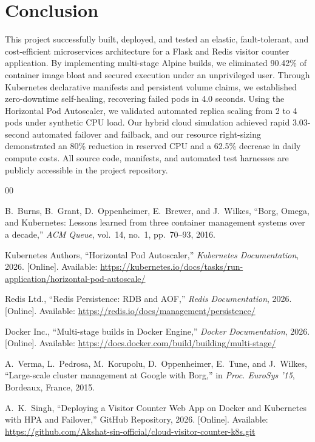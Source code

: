 \documentclass[conference]{IEEEtran}
\begin{document}
\section{Conclusion}

This project successfully built, deployed, and tested an elastic, fault-tolerant, and cost-efficient microservices architecture for a Flask and Redis visitor counter application. By implementing multi-stage Alpine builds, we eliminated 90.42\% of container image bloat and secured execution under an unprivileged user. Through Kubernetes declarative manifests and persistent volume claims, we established zero-downtime self-healing, recovering failed pods in 4.0 seconds. Using the Horizontal Pod Autoscaler, we validated automated replica scaling from 2 to 4 pods under synthetic CPU load. Our hybrid cloud simulation achieved rapid 3.03-second automated failover and failback, and our resource right-sizing demonstrated an 80\% reduction in reserved CPU and a 62.5\% decrease in daily compute costs. All source code, manifests, and automated test harnesses are publicly accessible in the project repository.

\begin{thebibliography}{00}

B.~Burns, B.~Grant, D.~Oppenheimer, E.~Brewer, and J.~Wilkes, ``Borg, Omega, and Kubernetes: Lessons learned from three container management systems over a decade,'' \emph{ACM Queue}, vol.~14, no.~1, pp.~70--93, 2016.

Kubernetes Authors, ``Horizontal Pod Autoscaler,'' \emph{Kubernetes Documentation}, 2026. [Online]. Available: \url{https://kubernetes.io/docs/tasks/run-application/horizontal-pod-autoscale/}

Redis Ltd., ``Redis Persistence: RDB and AOF,'' \emph{Redis Documentation}, 2026. [Online]. Available: \url{https://redis.io/docs/management/persistence/}

Docker Inc., ``Multi-stage builds in Docker Engine,'' \emph{Docker Documentation}, 2026. [Online]. Available: \url{https://docs.docker.com/build/building/multi-stage/}

A.~Verma, L.~Pedrosa, M.~Korupolu, D.~Oppenheimer, E.~Tune, and J.~Wilkes, ``Large-scale cluster management at Google with Borg,'' in \emph{Proc. EuroSys '15}, Bordeaux, France, 2015.

A.~K.~Singh, ``Deploying a Visitor Counter Web App on Docker and Kubernetes with HPA and Failover,'' GitHub Repository, 2026. [Online]. Available: \url{https://github.com/Akshat-sin-official/cloud-visitor-counter-k8s.git}

\end{thebibliography}
\end{document}
